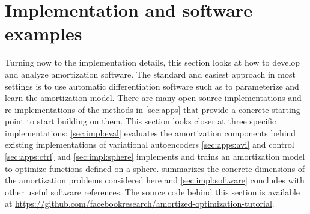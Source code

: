 \chapter{Implementation and software examples}
\label{sec:implementation}

\begin{table}[t]
  \centering
  \caption{Dimensions for the settings considered in this section}
  \label{tab:sizes}
\end{table}

Turning now to the implementation details, this section
looks at how to develop and analyze amortization software.
The standard and easiest approach in most settings is to use
automatic differentiation software such as
\citet{maclaurin2015autograd,al2016theano,abadi2016tensorflow,bezanson2017julia,agrawal2019tensorflow,paszke2019pytorch,bradbury2020jax}
to parameterize and learn the amortization model.
There are many open source implementations and re-implementations
of the methods in \cref{sec:apps} that provide a concrete
starting point to start building on them.
This section looks closer at three specific implementations:
\cref{sec:impl:eval} evaluates the amortization components
behind existing implementations of variational autoencoders
\cref{sec:apps:avi} and control \cref{sec:apps:ctrl} and
\cref{sec:impl:sphere} implements and trains an amortization model
to optimize functions defined on a sphere.
 summarizes the concrete dimensions of the amortization
problems considered here and \cref{sec:impl:software}
concludes with other useful software references.
The source code behind this section is available at
\url{https://github.com/facebookresearch/amortized-optimization-tutorial}.

